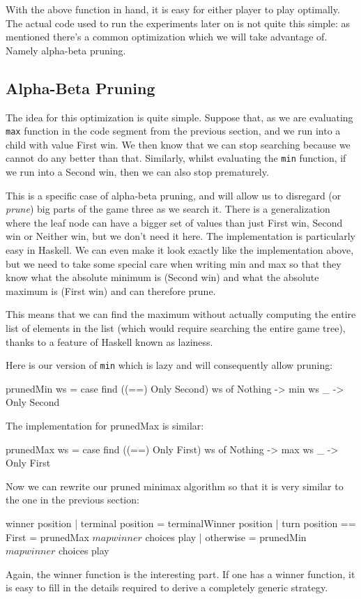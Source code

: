 With the above function in hand, it is easy for either player to play optimally.
The actual code used to run the experiments later on is not quite this simple: as mentioned there's a common optimization which we will take advantage of.
Namely alpha-beta pruning.

\subsection {Alpha-Beta Pruning}

The idea for this optimization is quite simple.
Suppose that, as we are evaluating \texttt{max} function in the code segment from the previous section, and we run into a child with value First win.
We then know that we can stop searching because we cannot do any better than that.
Similarly, whilst evaluating the \texttt{min} function, if we run into a Second win, then we can also stop prematurely.

This is a specific case of alpha-beta pruning, and will allow us to disregard (or \emph{prune}) big parts of the game three as we search it.
There is a generalization where the leaf node can have a bigger set of values than just First win, Second win or Neither win, but we don't need it here.
The implementation is particularly easy in Haskell. We can even make it look exactly like the implementation above, but we need to take some special care when writing min and max so that they know what the absolute minimum is (Second win) and what the absolute maximum is (First win) and can therefore prune.

This means that we can find the maximum without actually computing the entire list of elements in the list (which would require searching the entire game tree), thanks to a feature of Haskell known as laziness.

Here is our version of \texttt{min} which is lazy and will consequently allow pruning:
\begin{code}
  prunedMin ws = 
    case find ((==) Only Second) ws of
      Nothing -> min ws
      _ -> Only Second
\end{code}
The implementation for prunedMax is similar:
\begin{code}
  prunedMax ws = 
    case find ((==) Only First) ws of
      Nothing -> max ws
      _ -> Only First
\end{code}
Now we can rewrite our pruned minimax algorithm so that it is very similar to the one in the previous section:
\begin{code}
  winner position
    | terminal position       = terminalWinner position
    | turn position == First  = prunedMax $ map winner $ choices play
    | otherwise               = prunedMin $ map winner $ choices play
\end{code}
Again, the winner function is the interesting part. If one has a winner function, it is easy to fill in the details required to derive a completely generic strategy.

